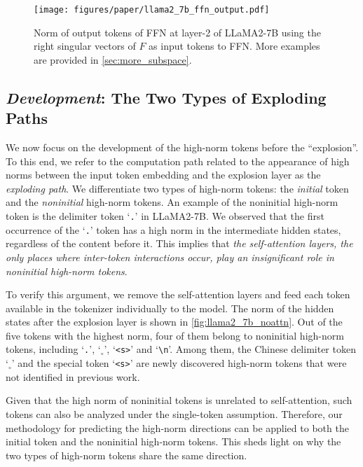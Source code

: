 \begin{figure}[t]
    \begin{center}
        \centerline{\texttt{[image: figures/paper/llama2\_7b\_ffn\_output.pdf]}}
    \vspace{-0.5em}
    \caption{Norm of output tokens of FFN at layer-2 of LLaMA2-7B using the right singular vectors of \(F\) as input tokens to FFN.
        More examples are provided in \cref{sec:more_subspace}.
        }\label{fig:llama2_7b_ffn_output}
    \vspace{-1.5em}
\end{center}
\end{figure}

\subsection{\emph{Development}: The Two Types of Exploding Paths}\label{sec:development}

We now focus on the development of the high-norm tokens before the ``explosion''.
To this end, we refer to the computation path related to the appearance of high norms between the input token embedding and the explosion layer as the \emph{exploding path}.
We differentiate two types of high-norm tokens: the \emph{initial} token and the \emph{noninitial} high-norm tokens.
An example of the noninitial high-norm token is the delimiter token `\texttt{.}' in LLaMA2-7B.
We observed that the first occurrence of the `\texttt{.}' token has a high norm in the intermediate hidden states, regardless of the content before it.
This implies that \emph{the self-attention layers, the only places where inter-token interactions occur, play an insignificant role in noninitial high-norm tokens}.

To verify this argument, we remove the self-attention layers and feed each token available in the tokenizer individually to the model.
The norm of the hidden states after the explosion layer is shown in \cref{fig:llama2_7b_noattn}.
Out of the five tokens with the highest norm, four of them belong to noninitial high-norm tokens, including `\texttt{.}', `\texttt{\(_\circ\)}', `\texttt{\textless s\textgreater}' and `\texttt{\textbackslash n}'.
Among them, the Chinese delimiter token `\texttt{\(_\circ\)}' and the special token `\texttt{\textless s\textgreater}' are newly discovered high-norm tokens that were not identified in previous work.

Given that the high norm of noninitial tokens is unrelated to self-attention, such tokens can also be analyzed under the single-token assumption.
Therefore, our methodology for predicting the high-norm directions can be applied to both the initial token and the noninitial high-norm tokens.
This sheds light on why the two types of high-norm tokens share the same direction.

